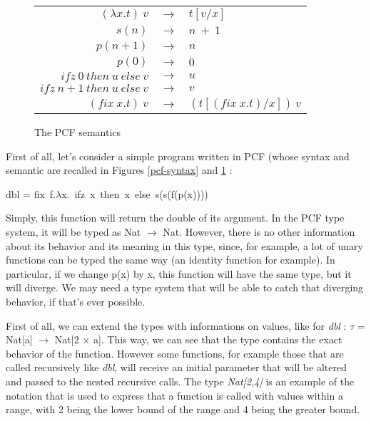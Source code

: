 \documentclass[a4paper,12pt]{article}
\begin{document}
\begin{figure}
  \begin{center}
    \begin{tabular}{r c l}
      $(\lambda x.t)~v$ & $\rightarrow$ & $t[v/x]$ \\
      $s(n)$ & $\rightarrow$ & $ n~+~1$ \\
      $p(n+1)$ & $\rightarrow$ & $ n$ \\
      $p(0)$ & $\rightarrow$ & $0$ \\
      $ifz~0~then~u~else~v$ & $\rightarrow$ & $u$ \\
      $ifz~n+1~then~u~else~v$ & $\rightarrow$ & $v$ \\
      $(fix~x.t)~v$ & $\rightarrow$ & $(t[(fix~x.t)/x])~v$
    \end{tabular}
  \end{center}
  \caption{The PCF semantics}
  \label{pcf-sem}
\end{figure}

First of all, let's consider a simple program written in PCF (whose syntax and
semantic are recalled in Figures \ref{pcf-syntax} and \ref{pcf-sem} :

\begin{center} 
  dbl = fix~f.$\lambda $x.~ifz~x~then~x~else~s(s(f(p(x)))) 
\end{center}

Simply, this function will return the double of its argument. In the PCF type
system, it will be typed as Nat $\rightarrow$ Nat. However, there is no other
information about its behavior and its meaning in this type, since, for example,
a lot of unary functions can be typed the same way (an identity function for
example). In particular, if we change p(x) by x, this function will have the
same type, but it will diverge. We may need a type system that will be able to
catch that diverging behavior, if that's ever possible.

First of all, we can extend the types with informations on values,
like for \emph{dbl} : $\tau$ = Nat[a] $\rightarrow$ Nat[2 $\times$
a]. This way, we can see that the type contains the exact behavior of
the function. However some functions, for example those that are called
recursively like \emph{dbl}, will receive an initial parameter that
will be altered and passed to the nested recursive calls. The type
\emph{Nat[2,4]} is an example of the notation that is used to
express that a function is called with values within a range, with 2
being the lower bound of the range and 4 being the greater
bound.
\end{document}
